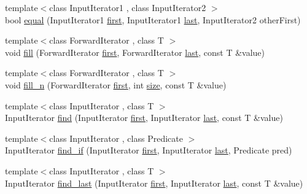 \begin{DoxyCompactItemize}
\item 
{\footnotesize template$<$class Input\+Iterator1 , class Input\+Iterator2 $>$ }\\bool \hyperlink{namespaceprism_ad3bede9a0f2c648e93677b14c45b1b7b}{equal} (Input\+Iterator1 \hyperlink{namespaceprism_ae3fb7a1926a9e8e59300cd5e370470da}{first}, Input\+Iterator1 \hyperlink{namespaceprism_abe4956c4e865f55ca126b7fb973b5078}{last}, Input\+Iterator2 other\+First)
\item 
{\footnotesize template$<$class Forward\+Iterator , class T $>$ }\\void \hyperlink{namespaceprism_a7c33653a5b4a07b31f5bde15e9085b45}{fill} (Forward\+Iterator \hyperlink{namespaceprism_ae3fb7a1926a9e8e59300cd5e370470da}{first}, Forward\+Iterator \hyperlink{namespaceprism_abe4956c4e865f55ca126b7fb973b5078}{last}, const T \&value)
\item 
{\footnotesize template$<$class Forward\+Iterator , class T $>$ }\\void \hyperlink{namespaceprism_aceb4b9c511a5edb706296b457427b226}{fill\+\_\+n} (Forward\+Iterator \hyperlink{namespaceprism_ae3fb7a1926a9e8e59300cd5e370470da}{first}, int \hyperlink{namespaceprism_acd3c0f96adf158a29387191d79c4d874}{size}, const T \&value)
\item 
{\footnotesize template$<$class Input\+Iterator , class T $>$ }\\Input\+Iterator \hyperlink{namespaceprism_a1b543d9c2862a539cc8b770abda87561}{find} (Input\+Iterator \hyperlink{namespaceprism_ae3fb7a1926a9e8e59300cd5e370470da}{first}, Input\+Iterator \hyperlink{namespaceprism_abe4956c4e865f55ca126b7fb973b5078}{last}, const T \&value)
\item 
{\footnotesize template$<$class Input\+Iterator , class Predicate $>$ }\\Input\+Iterator \hyperlink{namespaceprism_aa17e9e6c80f8a52479a52450a108a636}{find\+\_\+if} (Input\+Iterator \hyperlink{namespaceprism_ae3fb7a1926a9e8e59300cd5e370470da}{first}, Input\+Iterator \hyperlink{namespaceprism_abe4956c4e865f55ca126b7fb973b5078}{last}, Predicate pred)
\item 
{\footnotesize template$<$class Input\+Iterator , class T $>$ }\\Input\+Iterator \hyperlink{namespaceprism_a3189014b9fa31e0ef0d1933c6f616618}{find\+\_\+last} (Input\+Iterator \hyperlink{namespaceprism_ae3fb7a1926a9e8e59300cd5e370470da}{first}, Input\+Iterator \hyperlink{namespaceprism_abe4956c4e865f55ca126b7fb973b5078}{last}, const T \&value)
\item 

\end{DoxyCompactItemize}

